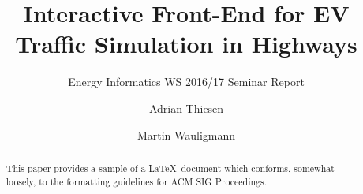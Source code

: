 \documentclass[sigconf]{acmart}
\begin{document}
\title{Interactive Front-End for EV Traffic Simulation in Highways}
\subtitle{Energy Informatics WS 2016/17 Seminar Report}

\author{Adrian Thiesen}
\vspace{2cm}

\author{Martin Wauligmann}
\vspace{2cm}


\begin{abstract}
This paper provides a sample of a \LaTeX\ document which conforms,
somewhat loosely, to the formatting guidelines for
ACM SIG Proceedings.
\end{abstract}



\maketitle






\end{document}
